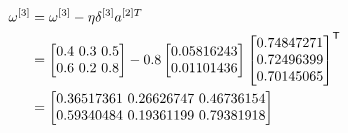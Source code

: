 \documentclass{article}
\begin{document}
\[
    \begin{aligned}
        \omega^{[3]} & =\omega^{[3]}-\eta\delta^{[3]}a^{[2]T} \\
                     & =\begin{bmatrix}
                            0.4 $ 0.3 $ 0.5 \\
                            0.6 $ 0.2 $ 0.8 \\
                        \end{bmatrix}
        - 0.8 \begin{bmatrix}
                  0.05816243 \\
                  0.01101436 \\
              \end{bmatrix}
        \begin{bmatrix}
            0.74847271 \\
            0.72496399 \\
            0.70145065 \\
        \end{bmatrix}^{\mathsf{T}}                      \\
                     & = \begin{bmatrix}
                             0.36517361 $ 0.26626747 $ 0.46736154 \\
                             0.59340484 $ 0.19361199 $ 0.79381918 \\
                         \end{bmatrix}
    \end{aligned}
\]
\end{document}
